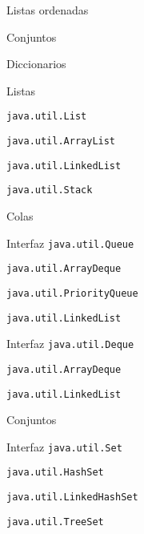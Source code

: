 \begin{longenum}
\begin{longenum}
\begin{longenum}
            \item Listas ordenadas
            \item Conjuntos
            \item Diccionarios
        \end{longenum}
        \item Listas
        \begin{longenum}
            \item \texttt{java.util.List}
            \begin{longenum}
                \item \texttt{java.util.ArrayList}
                \item \texttt{java.util.LinkedList}
                \item \texttt{java.util.Stack}
            \end{longenum}
        \end{longenum}
        \item Colas
        \begin{longenum}
            \item Interfaz \texttt{java.util.Queue}
            \begin{longenum}
                \item \texttt{java.util.ArrayDeque}
                \item \texttt{java.util.PriorityQueue}
                \item \texttt{java.util.LinkedList}
            \end{longenum}
            \item Interfaz \texttt{java.util.Deque}
            \begin{longenum}
                \item \texttt{java.util.ArrayDeque}
                \item \texttt{java.util.LinkedList}
            \end{longenum}
        \end{longenum}
        \item Conjuntos
        \begin{longenum}
            \item Interfaz \texttt{java.util.Set}
            \begin{longenum}
                \item \texttt{java.util.HashSet}
                \item \texttt{java.util.LinkedHashSet}
                \item \texttt{java.util.TreeSet}

\end{longenum}
\end{longenum}
\end{longenum}
\end{longenum}
